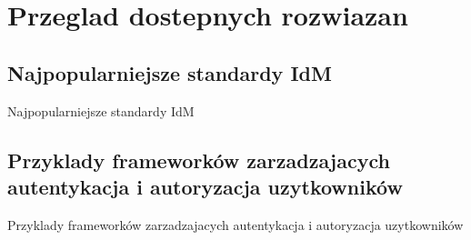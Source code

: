 \chapter{Przeglad dostepnych rozwiazan}
\label{cha:przegladRozwiazan}


\section{Najpopularniejsze standardy IdM}
\label{sec:standardyIdM}

Najpopularniejsze standardy IdM


\section{Przyklady frameworków zarzadzajacych autentykacja i autoryzacja uzytkowników}
\label{sec:frameworki}

Przyklady frameworków zarzadzajacych autentykacja i autoryzacja uzytkowników

